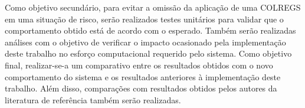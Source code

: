         Como objetivo secundário, para evitar a omissão da aplicação de uma COLREGS em uma situação de risco, serão realizados testes unitários para validar que o comportamento obtido está de acordo com o esperado. Também serão realizadas análises com o objetivo de verificar o impacto ocasionado pela implementação deste trabalho no esforço computacional requerido pelo sistema. Como objetivo final, realizar-se-a um comparativo entre os resultados obtidos com o novo comportamento do sistema e os resultados anteriores à implementação deste trabalho. Além disso, comparações com resultados obtidos pelos autores da literatura de referência também serão realizadas.